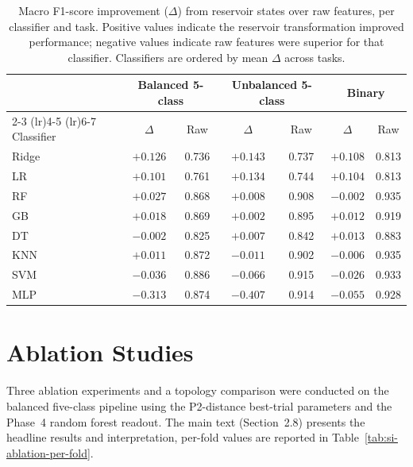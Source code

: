 \documentclass[journal=asbcd6,manuscript=suppinfo]{achemso}
\begin{document}
\begin{table}[H]
    \centering
    \caption{Macro F1-score improvement ($\Delta$) from reservoir states over raw features, per classifier and task. 
    Positive values indicate the reservoir transformation improved performance; negative values indicate raw features were superior for that classifier. 
    Classifiers are ordered by mean $\Delta$ across tasks.}
    \label{tab:reservoir-vs-raw-summary}
    \small
    \begin{tabular}{lcccccc}
        \toprule
        & \multicolumn{2}{c}{Balanced 5-class} & \multicolumn{2}{c}{Unbalanced 5-class} & \multicolumn{2}{c}{Binary} \\
        \cmidrule(lr){2-3} \cmidrule(lr){4-5} \cmidrule(lr){6-7}
        Classifier & $\Delta$ & Raw & $\Delta$ & Raw & $\Delta$ & Raw \\
        \midrule
        Ridge      & $+0.126$ & 0.736 & $+0.143$ & 0.737 & $+0.108$ & 0.813 \\
        LR         & $+0.101$ & 0.761 & $+0.134$ & 0.744 & $+0.104$ & 0.813 \\
        RF         & $+0.027$ & 0.868 & $+0.008$ & 0.908 & $-0.002$ & 0.935 \\
        GB         & $+0.018$ & 0.869 & $+0.002$ & 0.895 & $+0.012$ & 0.919 \\
        DT         & $-0.002$ & 0.825 & $+0.007$ & 0.842 & $+0.013$ & 0.883 \\
        KNN        & $+0.011$ & 0.872 & $-0.011$ & 0.902 & $-0.006$ & 0.935 \\
        SVM        & $-0.036$ & 0.886 & $-0.066$ & 0.915 & $-0.026$ & 0.933 \\
        MLP        & $-0.313$ & 0.874 & $-0.407$ & 0.914 & $-0.055$ & 0.928 \\
        \bottomrule
    \end{tabular}
\end{table}


\section{Ablation Studies}
\label{sec:si_ablation} %

Three ablation experiments and a topology comparison were conducted on the balanced five-class pipeline using the P2-distance best-trial parameters and the Phase~4 random forest readout. 
The main text (Section~2.8) presents the headline results and interpretation, per-fold values are reported in Table~\ref{tab:si-ablation-per-fold}.
\end{document}
